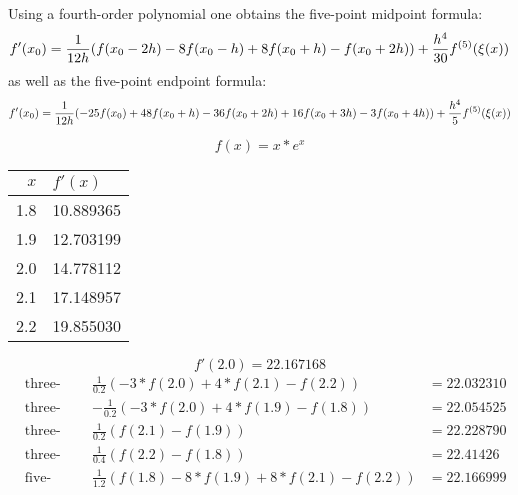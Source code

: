 Using a fourth-order polynomial one obtains the five-point midpoint formula:
\begin{equation*}
    f'(x_0) = \frac{1}{12h} (f(x_0-2h) - 8 f(x_0-h) + 8 f(x_0+h) - f(x_0+2h)) + \frac{h^4}{30} f^{(5)}(\xi(x))\\
\end{equation*}
as well as the five-point endpoint formula:
\begin{equation*}
    f'(x_0) = \frac{1}{12h} (-25 f(x_0) + 48 f(x_0+h) - 36 f(x_0+2h) + 16 f(x_0+3h) - 3 f(x_0+4h)) + \frac{h^4}{5} f^{(5)}(\xi(x))\\
\end{equation*}

\begin{example}
    \begin{equation*}
        f(x) = x * e^x
    \end{equation*}
    \begin{center}
        \begin{tabular}{r l}
            \toprule
            $x$ & $f'(x)$   \\
            \midrule
            1.8 & 10.889365 \\
            1.9 & 12.703199 \\
            2.0 & 14.778112 \\
            2.1 & 17.148957 \\
            2.2 & 19.855030 \\
        \end{tabular}
    \end{center}
    \begin{equation*}
        f'(2.0) = 22.167168
    \end{equation*}
    \begin{align*}
        &\text{three-point endpoint h = 0.1} &\frac{1}{0.2}(-3*f(2.0) + 4*f(2.1) - f(2.2)) &= 22.032310\\
        &\text{three-point endpoint h = -0.1} &-\frac{1}{0.2} (-3*f(2.0) + 4*f(1.9) - f(1.8)) &= 22.054525\\
        &\text{three-point midpoint h = 0.1} &\frac{1}{0.2} (f(2.1) - f(1.9)) &= 22.228790\\
        &\text{three-point midpoint h = 0.2} &\frac{1}{0.4} (f(2.2) - f(1.8)) &= 22.41426\\
        &\text{five-point midpoint h = 0.1} &\frac{1}{1.2}(f(1.8)-8*f(1.9)+8*f(2.1)-f(2.2)) &= 22.166999\\
    \end{align*}
\end{example}